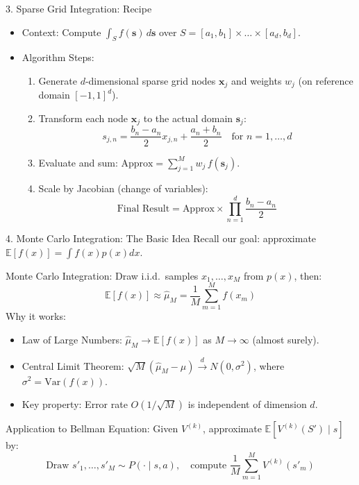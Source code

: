 \documentclass[aspectratio=169]{beamer}
\newcommand{\1}{\mathbf{1}}
\begin{document}
\begin{frame}{3. Sparse Grid Integration: Recipe}
\small
\begin{itemize}\setlength{\itemsep}{1.5mm}
    \item Context: Compute $\int_S f(\mathbf{s}) \, d\mathbf{s}$ over $S = [a_1, b_1] \times \dots \times [a_d, b_d]$.
    \item Algorithm Steps:
    \begin{enumerate}\setlength{\itemsep}{1.5mm}
        \item Generate $d$-dimensional sparse grid nodes $\mathbf{x}_j$ and weights $w_j$ (on reference domain $[-1, 1]^d$).
        \item Transform each node $\mathbf{x}_j$ to the actual domain $\mathbf{s}_j$:
        \[ s_{j,n} = \frac{b_n-a_n}{2}x_{j,n} + \frac{a_n+b_n}{2} \quad \text{for } n=1, \dots, d \]
        \item Evaluate and sum: $\text{Approx} = \sum_{j=1}^M w_j \, f(\mathbf{s}_j)$.
        \item Scale by Jacobian (change of variables):
        \[ \text{Final Result} = \text{Approx} \times \prod_{n=1}^d \frac{b_n-a_n}{2} \]
    \end{enumerate}
\end{itemize}
\end{frame}

\begin{frame}{4. Monte Carlo Integration: The Basic Idea}
\small
Recall our goal: approximate $\mathbb{E}[f(x)] = \int f(x)p(x)dx$.

Monte Carlo Integration: Draw i.i.d.\ samples $x_1, \dots, x_M$ from $p(x)$, then:
\[
    \mathbb{E}[f(x)] \approx \hat{\mu}_M = \frac{1}{M}\sum_{m=1}^{M} f(x_m)
\]
Why it works:
\begin{itemize}\setlength{\itemsep}{1mm}
    \item Law of Large Numbers: $\hat{\mu}_M \to \mathbb{E}[f(x)]$ as $M \to \infty$ (almost surely).
    \item Central Limit Theorem: $\sqrt{M}(\hat{\mu}_M - \mu) \xrightarrow{d} N(0, \sigma^2)$, where $\sigma^2 = \text{Var}(f(x))$.
    \item Key property: Error rate $O(1/\sqrt{M})$ is independent of dimension $d$.
\end{itemize}

Application to Bellman Equation: Given $V^{(k)}$, approximate $\mathbb{E}[V^{(k)}(S') \mid s]$ by:
\[
    \text{Draw } s'_1, \dots, s'_M \sim P(\cdot \mid s, a), \quad \text{compute } \frac{1}{M}\sum_{m=1}^M V^{(k)}(s'_m)
\]
\end{frame}
\end{document}
